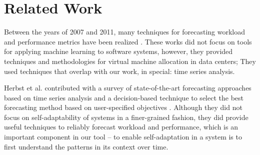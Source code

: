 
\section{Related Work}

Between the years of 2007 and 2011, many techniques for forecasting workload and performance metrics have been realized \cite{gmach2007workload, towards_autonomic_allocation, bobroff2007dynamic, meng2010efficient, caron2011pattern}. These works did not focus on tools for applying machine learning to software systems, however, they provided techniques and methodologies for virtual machine allocation in data centers; They used techniques that overlap with our work, in special: time series analysis.

Herbst et al. contributed with a survey of state-of-the-art forecasting approaches based on time series analysis and a decision-based technique to select the best forecasting method based on user-specified objectives \cite{herbst_self-adaptive_2014}. Although they did not focus on self-adaptability of systems in a finer-grained fashion, they did provide useful techniques to reliably forecast workload and performance, which is an important component in our tool -- to enable self-adaptation in a system is to first understand the patterns in its context over time.

